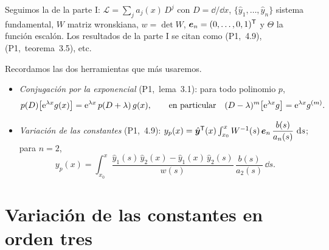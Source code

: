 \documentclass[11pt,twoside]{article}
\newcommand\Lop{\mathcal L}
\newcommand\yh{\hat y}
\newcommand\vyh{\hat{\bm y}}
\newcommand\D{D}
\newcommand\pI[1]{(P1,~#1)}
\begin{document}
\begin{observacion}[notación]
Seguimos la de la parte I: $\Lop=\sum_ja_j(x)\,\D^j$ con $\D=\dd/\dd x$, $\{\yh_1,\dots,\yh_n\}$ sistema fundamental,
$W$ matriz wronskiana, $w=\det W$, $\bm e_n=(0,\dots,0,1)^{\mathsf T}$ y $\Theta$ la función escalón. Los resultados de la
parte I se citan como \pI{4.9}, \pI{teorema~3.5}, etc.
\end{observacion}

Recordamos las dos herramientas que más usaremos.
\begin{itemize}
\item \emph{Conjugación por la exponencial} \pI{lema~3.1}: para todo polinomio $p$,
\begin{equation}\label{eq:conj}
p(\D)\big[\e^{\lambda x}g(x)\big]=\e^{\lambda x}\,p(\D+\lambda)\,g(x),\qquad\text{en particular}\quad
(\D-\lambda)^m\big[\e^{\lambda x}g\big]=\e^{\lambda x}g^{(m)} .
\end{equation}
\item \emph{Variación de las constantes} \pI{4.9}: $y_p(x)=\vyh\T(x)\int_{x_0}^{x}W^{-1}(s)\,\bm e_n\,\dfrac{b(s)}{a_n(s)}\,\dd s$; para
$n=2$,
\begin{equation}\label{eq:vc2}
y_p(x)=\int_{x_0}^{x}\frac{\yh_1(s)\,\yh_2(x)-\yh_1(x)\,\yh_2(s)}{w(s)}\,\frac{b(s)}{a_2(s)}\,\dd s .
\end{equation}
\end{itemize}

\section{Variación de las constantes en orden tres}\label{sec:orden3}
\end{document}
